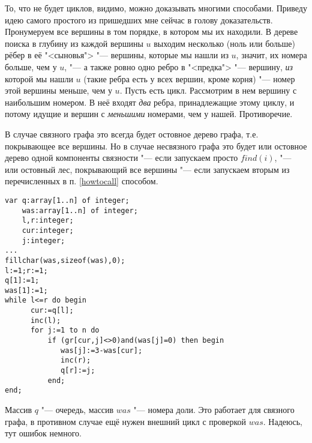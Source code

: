 \cleardoublepage
{}
 То, что не будет циклов, видимо, можно доказывать многими способами. Приведу идею
самого простого из пришедших мне сейчас в голову доказательств. Пронумеруем все вершины в том порядке, 
в котором мы их находили. В дереве поиска в глубину из каждой вершины $u$ выходим несколько (ноль или больше)
рёбер в её "<сыновья"> "--- вершины, которые мы нашли из $u$, значит, их номера больше, чем у $u$, "---
а также ровно одно ребро в "<предка"> "--- вершину, \textit{из} которой мы нашли $u$ (такие ребра есть
у всех вершин, кроме корня) "--- номер этой вершины меньше, чем у $u$. Пусть есть цикл. Рассмотрим в нем вершину с 
наибольшим номером. В неё входят \textit{два} ребра, принадлежащие этому циклу, и потому идущие и вершин с \textit{меньшими}
номерами, чем у нашей. Противоречие.

В случае связного графа это всегда будет остовное дерево графа, т.е. покрывающее все вершины. Но в случае
несвязного графа это будет или остовное дерево одной компоненты связности "--- если запускаем просто $find(i)$,
"--- или остовный лес, покрывающий все вершины "--- если запускаем вторым из перечисленных в п. \ref{howtocall}
способом.




\begin{codesample}\begin{verbatim}
var q:array[1..n] of integer;
    was:array[1..n] of integer;
    l,r:integer;
    cur:integer;
    j:integer;
...
fillchar(was,sizeof(was),0);
l:=1;r:=1;
q[1]:=1;
was[1]:=1;
while l<=r do begin
      cur:=q[l];
      inc(l);
      for j:=1 to n do
          if (gr[cur,j]<>0)and(was[j]=0) then begin
             was[j]:=3-was[cur];
             inc(r);
             q[r]:=j;
          end;
end;
\end{verbatim}\end{codesample}
Массив $q$ "--- очередь, массив $was$ "--- номера доли. Это работает для связного графа, в противном случае ещё
нужен внешний цикл с проверкой $was$. Надеюсь, тут ошибок немного.

